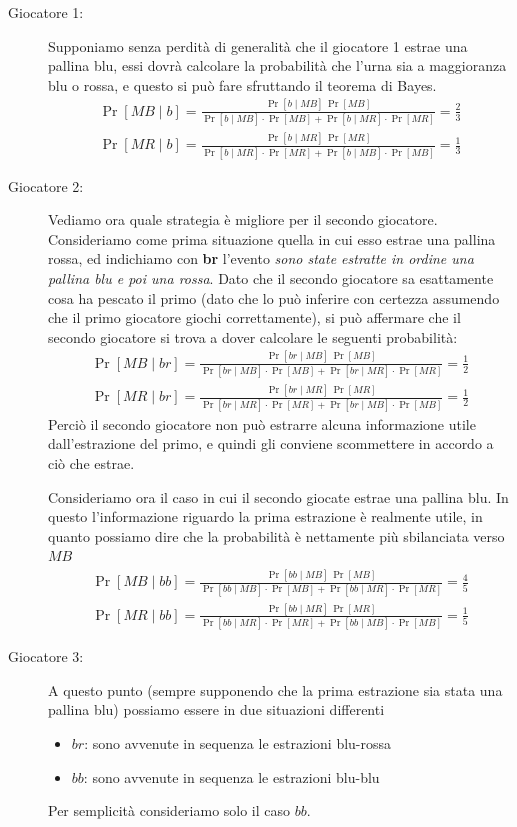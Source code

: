 \begin{description}
    \item[Giocatore 1:] Supponiamo senza perdità di generalità che il giocatore 1 estrae una pallina blu, essi dovrà calcolare la probabilità che l'urna sia a maggioranza blu o rossa, e questo si può fare sfruttando il teorema di Bayes.
    \begin{align*}
        \Pr[MB \mid b] = \frac{\Pr[b\mid MB]\,\Pr[MB]}{\Pr[b \mid MB] \cdot \Pr[MB] + \Pr[b \mid MR] \cdot \Pr[MR]} = \frac{2}{3} \\[0.5cm]
        \Pr[MR \mid b] = \frac{\Pr[b\mid MR]\,\Pr[MR]}{\Pr[b \mid MR] \cdot \Pr[MR] + \Pr[b \mid MB] \cdot \Pr[MB]} = \frac{1}{3}
    \end{align*}
    \item[Giocatore 2:] Vediamo ora quale strategia è migliore per il secondo giocatore. Consideriamo come prima situazione quella in cui esso estrae una pallina rossa, ed indichiamo con \textbf{br} l'evento \textit{sono state estratte in ordine una pallina blu e poi una rossa}. Dato che il secondo giocatore sa esattamente cosa ha pescato il primo (dato che lo può inferire con certezza assumendo che il primo giocatore giochi correttamente), si può affermare che il secondo giocatore si trova a dover calcolare le seguenti probabilità:
    \begin{align*}
        \Pr[MB \mid br] = \frac{\Pr[br\mid MB]\,\Pr[MB]}{\Pr[br \mid MB] \cdot \Pr[MB] + \Pr[br \mid MR] \cdot \Pr[MR]} = \frac{1}{2} \\[0.5cm]
        \Pr[MR \mid br] = \frac{\Pr[br\mid MR]\,\Pr[MR]}{\Pr[br \mid MR] \cdot \Pr[MR] + \Pr[br \mid MB] \cdot \Pr[MB]} = \frac{1}{2}
    \end{align*} 
    Perciò il secondo giocatore non può estrarre alcuna informazione utile dall'estrazione del primo, e quindi gli conviene scommettere in accordo a ciò che estrae.

    Consideriamo ora il caso in cui il secondo giocate estrae una pallina blu. In questo l'informazione riguardo la prima estrazione è realmente utile, in quanto possiamo dire che la probabilità è nettamente più sbilanciata verso $MB$
    \begin{align*}
        \Pr[MB \mid bb] = \frac{\Pr[bb\mid MB]\,\Pr[MB]}{\Pr[bb \mid MB] \cdot \Pr[MB] + \Pr[bb \mid MR] \cdot \Pr[MR]} = \frac{4}{5} \\[0.5cm]
        \Pr[MR \mid bb] = \frac{\Pr[bb\mid MR]\,\Pr[MR]}{\Pr[bb \mid MR] \cdot \Pr[MR] + \Pr[bb \mid MB] \cdot \Pr[MB]} = \frac{1}{5}
    \end{align*}
    \item[Giocatore 3:] A questo punto (sempre supponendo che la prima estrazione sia stata una pallina blu) possiamo essere in due situazioni differenti
    \begin{itemize}
        \item $br$: sono avvenute in sequenza le estrazioni blu-rossa
        \item $bb$: sono avvenute in sequenza le estrazioni blu-blu
    \end{itemize}
    Per semplicità consideriamo solo il caso $bb$.
    

\end{description}
